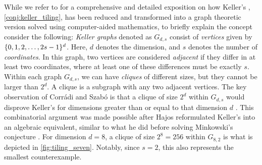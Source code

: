 \documentclass[../thesis.tex]{subfiles}
\begin{document}
While we refer to \cite{brakensiekResolutionKellerConjecture2020} for a comprehensive and detailed exposition on how Keller's , \cref{conj:keller_tiling}, has been reduced and transformed into a graph theoretic version solved using computer-aided mathematics, to briefly explain the concept consider the following: \emph{Keller graphs} denoted as $G_{d,s}$ consist of \emph{vertices} given by $\{0,1,2,\dots,2s-1\}^d$. Here, $d$ denotes the dimension, and $s$ denotes the number of \emph{coordinates}. In this graph, two vertices are considered \emph{adjacent} if they differ in at least two coordinates, where at least one of these differences must be exactly $s$. Within each graph $G_{d,s}$, we can have \emph{cliques} of different sizes, but they cannot be larger than $2^d$. A clique is a subgraph with any two adjacent vertices. The key observation of Corr{\'a}di and Szab{\'o} is that a clique of size $2^d$ within $G_{d,s}$ would disprove Keller's  for dimensions greater than or equal to that dimension $d$ \cite{corradiCombinatorialApproachKeller1990}. This combinatorial argument was made possible after Hajos reformulated Keller's  into an algebraic equivalent, similar to what he did before solving Minkowski's conjecture \cite{lagariasKellerCubetilingConjecture1992,hajosUeberEinfacheUnd1942}. For dimension $d=8$, a clique of size $2^8=256$ within $G_{8,2}$ is what is depicted in \cref{fig:tiling_seven}. Notably, since $s=2$, this also represents the smallest counterexample. %



\end{document}

